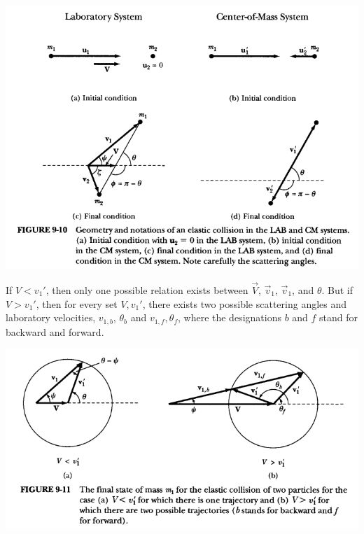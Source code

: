 \documentclass[11pt,oneside]{book}
\theoremstyle{break}
\theoremstyle{break}
\begin{document}
\begin{center}
\includegraphics[scale=0.69]{scatter.png}
\end{center}

If $V<v_1'$, then only one possible relation exists between $\vec{V}$, $\vec{v}_1$, $\vec{v}_1$, and $\theta$. But if $V>v_1'$, then for every set $V, v_1'$, there exists two possible scattering angles and laboratory velocities, $v_{1,b}$, $\theta_b$ and $v_{1,f},\theta_f$, where the designations $b$ and $f$ stand for backward and forward.\\

\begin{center}
\includegraphics[scale=0.69]{scatterf&b.png}
\end{center}
\end{document}

